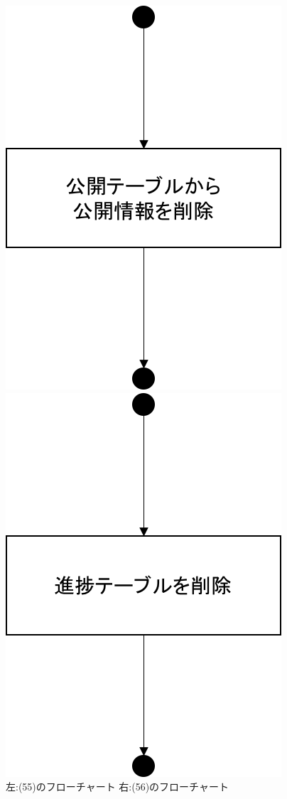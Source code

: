 \begin{figure}[htbp]
 \begin{minipage}{0.5\hsize}
  \begin{center}
   \includegraphics[width=0.6\linewidth,clip]{./img/flow/55.png}
  \end{center}
 \end{minipage}
 \begin{minipage}{0.5\hsize}
  \begin{center}
   \includegraphics[width=0.6\linewidth,clip]{./img/flow/56.png}
  \end{center}
 \end{minipage}
 \caption{左:(55)のフローチャート 右:(56)のフローチャート}\label{fig:54to55to56}
\end{figure}

